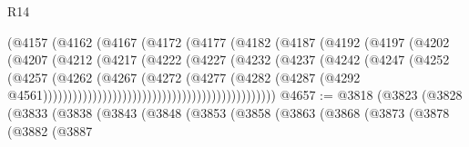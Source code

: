 \begin{lexlean}{R14}
\begin{coremodule}
                                          (@4157
                                            (@4162
                                              (@4167
                                                (@4172
                                                  (@4177
                                                    (@4182
                                                      (@4187
                                                        (@4192
                                                          (@4197
                                                            (@4202
                                                              (@4207
                                                                (@4212
                                                                  (@4217
                                                                    (@4222
                                                                      (@4227
                                                                        (@4232
                                                                          (@4237
                                                                            (@4242
                                                                              (@4247
                                                                                (@4252
                                                                                  (@4257
                                                                                    (@4262
                                                                                      (@4267
                                                                                        (@4272
                                                                                          (@4277
                                                                                            (@4282
                                                                                              (@4287
                                                                                                (@4292
                                                                                                  @4561)))))))))))))))))))))))))))))))))))))))))))))))
@4657 := @3818
    (@3823
      (@3828
        (@3833
          (@3838
            (@3843
              (@3848
                (@3853
                  (@3858
                    (@3863
                      (@3868
                        (@3873
                          (@3878
                            (@3882
                              (@3887

\end{coremodule}
\end{lexlean}
